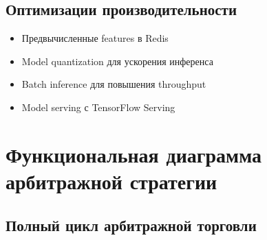 \documentclass[a4paper,11pt]{article}
\begin{document}
\subsection{Оптимизации производительности}

\begin{itemize}
    \item Предвычисленные features в Redis
    \item Model quantization для ускорения инференса
    \item Batch inference для повышения throughput
    \item Model serving с TensorFlow Serving
\end{itemize}

\newpage

\section{Функциональная диаграмма арбитражной стратегии}

\subsection{Полный цикл арбитражной торговли}
\end{document}
